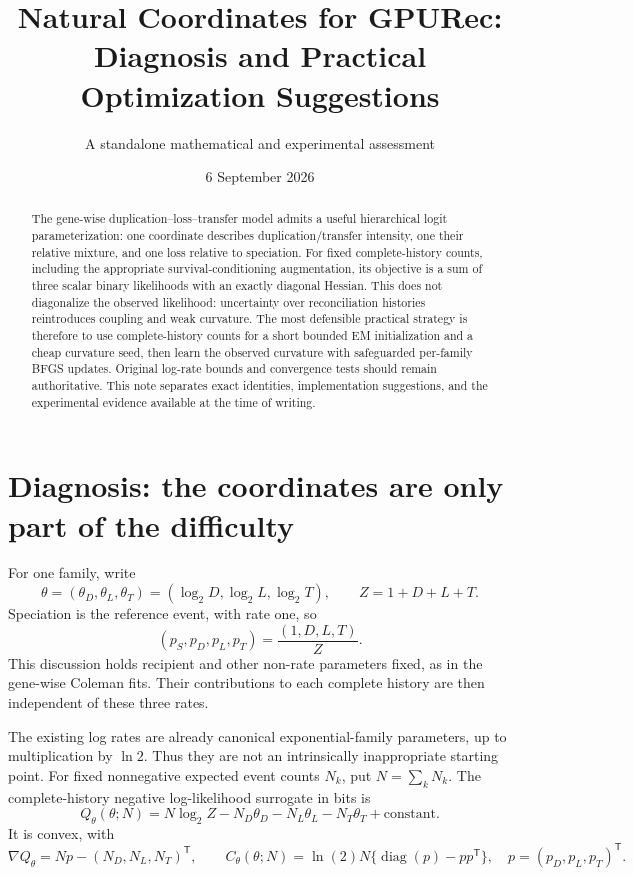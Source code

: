 \documentclass[11pt]{article}
\title{Natural Coordinates for GPURec:\\Diagnosis and Practical Optimization Suggestions}
\author{A standalone mathematical and experimental assessment}
\date{6 September 2026}
\newcommand{\diag}{\operatorname{diag}}
\newcommand{\tr}{\mathsf T}
\begin{document}
\maketitle

\begin{abstract}
The gene-wise duplication--loss--transfer model admits a useful hierarchical
logit parameterization: one coordinate describes duplication/transfer intensity,
one their relative mixture, and one loss relative to speciation. For fixed
complete-history counts, including the appropriate survival-conditioning
augmentation, its objective is a sum of three scalar binary likelihoods with an
exactly diagonal Hessian. This does not diagonalize the observed likelihood:
uncertainty over reconciliation histories reintroduces coupling and weak
curvature. The most defensible practical strategy is therefore to use
complete-history counts for a short bounded EM initialization and a cheap
curvature seed, then learn the observed curvature with safeguarded per-family
BFGS updates. Original log-rate bounds and convergence tests should remain
authoritative. This note separates exact identities, implementation suggestions,
and the experimental evidence available at the time of writing.
\end{abstract}

\section{Diagnosis: the coordinates are only part of the difficulty}

For one family, write
\[
 \theta=(\theta_D,\theta_L,\theta_T)
       =(\log_2 D,\log_2 L,\log_2 T),\qquad
 Z=1+D+L+T.
\]
Speciation is the reference event, with rate one, so
\begin{equation}
 (p_S,p_D,p_L,p_T)=\frac{(1,D,L,T)}{Z}.
 \label{eq:probabilities}
\end{equation}
This discussion holds recipient and other non-rate parameters fixed, as in the
gene-wise Coleman fits. Their contributions to each complete history are then
independent of these three rates.

The existing log rates are already canonical exponential-family parameters, up
to multiplication by $\ln 2$. Thus they are not an intrinsically inappropriate
starting point. For fixed nonnegative expected event counts $N_k$, put
$N=\sum_k N_k$. The complete-history negative log-likelihood surrogate in bits is
\begin{equation}
 Q_\theta(\theta;N)
 =N\log_2 Z-N_D\theta_D-N_L\theta_L-N_T\theta_T+\text{constant}.
 \label{eq:surrogate-theta}
\end{equation}
It is convex, with
\begin{equation}
 \nabla Q_\theta=Np-(N_D,N_L,N_T)^\tr,\qquad
 C_\theta(\theta;N)=\ln(2)N\{\diag(p)-pp^\tr\},
 \quad p=(p_D,p_L,p_T)^\tr.
 \label{eq:surrogate-curvature}
\end{equation}
\end{document}

